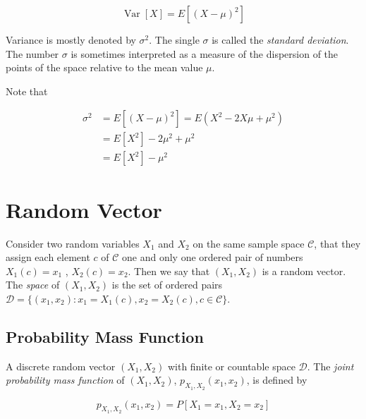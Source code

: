 \documentclass{article}
\begin{document}
            \begin{equation}
                \operatorname{Var}[ X ] = E [ (X - \mu)^{2} ]
            \end{equation}

            Variance is mostly denoted by $ \sigma^{2} $. The single $ \sigma $ is
            called the \textit{standard deviation}. The number $ \sigma $ is sometimes
            interpreted as a measure of the dispersion of the points of the space
            relative to the mean value $ \mu $.

            Note that

            \begin{align*}
                \sigma^2 &= E [ ( X - \mu )^{2} ] = E ( X^2 - 2 X \mu + \mu^{2} ) \\
                         &= E [ X^{2} ] - 2 \mu^{2} + \mu^{2} \\
                         &= E [ X^{2} ] - \mu^{2}
            \end{align*}

    \section{Random Vector}

        Consider two random variables $ X_{1} $ and $ X_{2} $ on the same
        sample space $ \mathcal{C} $, that they assign each element $ c $ of $
        \mathcal{C} $ one and only one ordered pair of numbers $ X_{1}(c) =
        x_{1} $ , $ X_{2}(c) = x_{2} $. Then we say that $ (X_{1}, X_{2}) $ is
        a random vector. The \textit{space} of $ (X_{1}, X_{2}) $ is the set
        of ordered pairs $ \mathcal{D} =  \{ (x_{1}, x_{2}) : x_{1} = X_{1}(c),
        x_{2} = X_{2}(c), c \in \mathcal{C} \} $.

        \subsection{Probability Mass Function}

            A discrete random vector $ (X_{1}, X_{2}) $ with finite or
            countable space $ \mathcal{D} $. The \textit{joint probability mass
            function} of $ (X_{1}, X_{2})$, $ p_{X_{1}, X_{2}}(x_{1}, x_{2}) $,
            is defined by

            \begin{equation*}
                p_{ X_{1}, X_{2}} (x_{1}, x_{2}) = P [ X_{1} = x_{1}, X_{2} = x_{2} ]
            \end{equation*}
\end{document}
